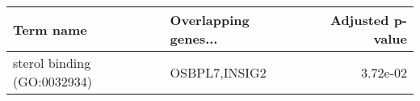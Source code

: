 \begin{tabular}{llr}
\toprule
                  Term name & Overlapping genes... &  Adjusted p-value \\
\midrule
sterol binding (GO:0032934) &        OSBPL7,INSIG2 &          3.72e-02 \\
\bottomrule
\end{tabular}
